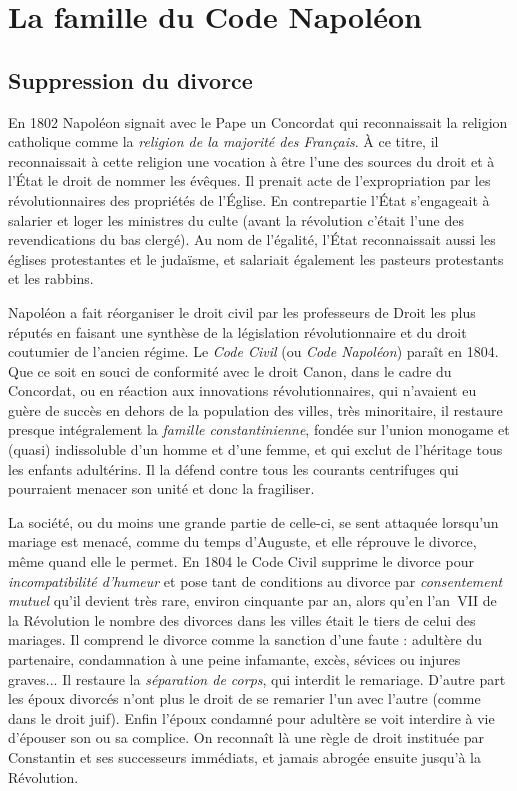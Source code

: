 


\chapter{La famille du Code Napoléon}

\section{Suppression du divorce}
 En 1802 Napoléon signait avec le Pape un Concordat qui reconnaissait la religion catholique comme la \emph{religion de la majorité des Français}. À ce titre, il reconnaissait à cette religion une vocation à être l'une des sources du droit et à l'État le droit de nommer les évêques. Il prenait acte de l'expropriation par les révolutionnaires des propriétés de l'Église. En contrepartie l'État s'engageait à salarier et loger les ministres du culte (avant la révolution c'était l'une des revendications du bas clergé). Au nom de l'égalité, l'État reconnaissait aussi les églises protestantes et le judaïsme, et salariait également les pasteurs protestants et les rabbins.
 
 Napoléon a fait réorganiser le droit civil par les professeurs de Droit les plus réputés en faisant une synthèse de la législation révolutionnaire et du droit coutumier de l'ancien régime.  Le \emph{Code Civil} (ou \emph{Code Napoléon}) paraît en 1804. Que ce soit en souci de conformité avec le droit Canon, dans le cadre du Concordat, ou en réaction aux innovations révolutionnaires, qui n'avaient eu guère de succès en dehors de la population des villes, très minoritaire, il restaure presque intégralement la \emph{famille constantinienne}, fondée sur l'union monogame et (quasi) indissoluble d'un homme et d'une femme, et qui exclut de l'héritage tous les enfants adultérins. Il la défend contre tous les courants centrifuges qui pourraient menacer son unité et donc la fragiliser. 
 
 La société, ou du moins une grande partie de celle-ci, se sent attaquée lorsqu'un mariage est menacé, comme du temps d'Auguste, et elle réprouve le divorce, même quand elle le permet. En 1804 le Code Civil supprime le divorce pour \emph{incompatibilité d'humeur} et pose tant de conditions au divorce par \emph{consentement mutuel} qu'il devient très rare, environ cinquante par an, alors qu'en l'an~VII de la Révolution le nombre des divorces dans les villes était le tiers de celui des mariages. Il comprend le divorce comme la sanction d'une faute : adultère du partenaire, condamnation à une peine infamante, excès, sévices ou injures graves... Il restaure la \emph{séparation de corps}, qui interdit le remariage. D'autre part les époux divorcés n'ont plus le droit de se remarier l'un avec l'autre (comme dans le droit juif). Enfin l'époux condamné pour adultère se voit interdire à vie d'épouser son ou sa complice. On reconnaît là une règle de droit instituée par Constantin et ses successeurs immédiats, et jamais abrogée ensuite jusqu'à la Révolution. 



